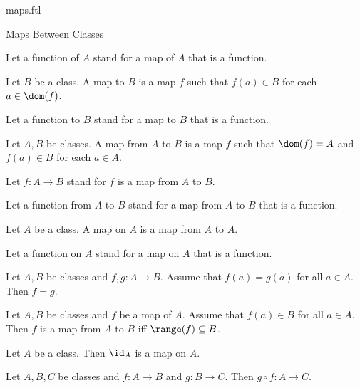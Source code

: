 \documentclass{naproche-library}
\begin{document}
\begin{smodule}[title=Maps]{maps.ftl}
\begin{sfragment}{Maps Between Classes}
\begin{definition}[forthel,id=FOUNDATIONS_06_6934038600220672]
    Let a function of $A$ stand for a map of $A$ that is a function.
  \end{definition}

  \begin{definition}[forthel,id=FOUNDATIONS_06_7725375157174272]
    Let $B$ be a class.
    A map to $B$ is a map $f$ such that $f(a) \in B$ for each $a \in \dom(f)$.

    Let a function to $B$ stand for a map to $B$ that is a function.
  \end{definition}

  \begin{definition}[forthel,id=FOUNDATIONS_06_2823507398361088]
    Let $A, B$ be classes.
    A map from $A$ to $B$ is a map $f$ such that $\dom(f) = A$ and $f(a) \in B$ for each $a \in A$.

    Let $f: A \to B$ stand for $f$ is a map from $A$ to $B$.

    Let a function from $A$ to $B$ stand for a map from $A$ to $B$ that is a function.
  \end{definition}

  \begin{definition}[forthel,id=FOUNDATIONS_06_3390734908522496]
    Let $A$ be a class.
    A map on $A$ is a map from $A$ to $A$.

    Let a function on $A$ stand for a map on $A$ that is a function.
  \end{definition}

  \begin{proposition}[forthel,id=FOUNDATIONS_06_3312973569327104]
    Let $A, B$ be classes and $f, g : A \to B$.
    Assume that $f(a) = g(a)$ for all $a \in A$.
    Then $f = g$.
  \end{proposition}

  \begin{proposition}
    Let $A, B$ be classes and $f$ be a map of $A$.
    Assume that $f(a) \in B$ for all $a \in A$.
    Then $f$ is a map from $A$ to $B$ iff $\range(f) \subseteq B$.
  \end{proposition}

  \begin{proposition}[forthel,id=FOUNDATIONS_06_5104361690628096]
    Let $A$ be a class.
    Then $\id_{A}$ is a map on $A$.
  \end{proposition}

  \begin{proposition}[forthel,id=FOUNDATIONS_06_1706446651654144]
    Let $A, B, C$ be classes and $f : A \to B$ and $g : B \to C$.
    Then $g \circ f : A \to C$.
  \end{proposition}


\end{sfragment}
\end{smodule}
\end{document}
